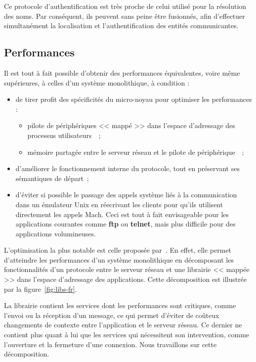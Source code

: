 Ce protocole d'authentification est tr\`es proche de celui utilis\'e pour la r\'esolution des noms. Par cons\'equent, ils peuvent sans peine \^etre fusionn\'es, afin d'effectuer simultan\'ement la localisation et l'authentification des entit\'es communicantes. 

\subsection{Performances}

Il est tout \`a fait possible d'obtenir des performances \'equivalentes, voire m\^eme sup\'erieures, \`a celles d'un syst\`eme monolithique, \`a condition :
\begin{itemize}
\item de tirer profit des sp\'ecificit\'es du micro-noyau pour optimiser les performances : 
	\begin{itemize}
	\item pilote de p\'eriph\'eriques << mapp\'e >> dans l'espace d'adressage des processus utilisateurs~\cite{Forin91}~;
	\item m\'emoire partag\'ee entre le serveur r\'eseau et le pilote de p\'eriph\'erique~\cite{Reynolds91}~;
	\end{itemize}
\item d'am\'eliorer le fonctionnement interne du protocole, tout en pr\'eservant ses s\'emantiques de d\'epart~;
\item d'\'eviter si possible le passage des appels syst\`eme li\'es \`a la communication dans un \'emulateur Unix en r\'eecrivant les clients pour qu'ils utilisent directement les appels Mach. Ceci est tout \`a fait envisageable pour les applications courantes comme {\bf ftp} ou {\bf telnet}, mais plus difficile pour des applications volumineuses.
\end{itemize}


L'optimisation la plus notable est celle propos\'ee par~\cite{Maeda93}. En effet, elle permet d'atteindre les performances d'un syst\`eme monolithique en d\'ecomposant les fonctionnalit\'es d'un protocole entre le serveur r\'eseau et une librairie << mapp\'ee >> dans l'espace d'adressage des applications. Cette d\'ecomposition est illustr\'ee par la figure~\ref{fig:libs-fr}.

La librairie contient les services dont les performances sont critiques, comme l'envoi ou la r\'eception d'un message, ce qui permet d'\'eviter de co\^uteux changements de contexte entre l'application et le serveur r\'eseau. Ce dernier ne contient plus quant \`a lui que les services qui n\'ecessitent son intervention, comme l'ouverture et la fermeture d'une connexion. 
Nous travaillons sur cette d\'ecomposition.



